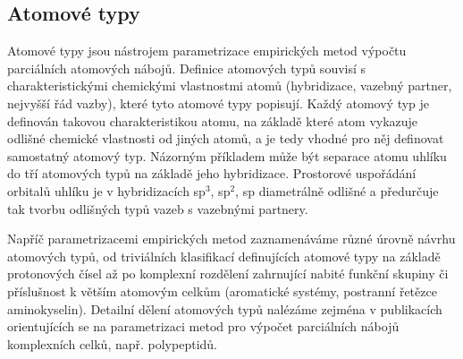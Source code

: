 
\subsection{Atomové typy}
Atomové typy jsou nástrojem parametrizace empirických metod výpočtu parciálních atomových nábojů. Definice atomových typů souvisí s charakteristickými chemickými vlastnostmi atomů (hybridizace, vazebný partner, nejvyšší řád vazby), které tyto atomové typy popisují. Každý atomový typ je definován takovou charakteristikou atomu, na základě které atom vykazuje odlišné chemické vlastnosti od jiných atomů, a je tedy vhodné pro něj definovat samostatný atomový typ. Názorným příkladem může být separace atomu uhlíku do tří atomových typů na základě jeho hybridizace. Prostorové uspořádání orbitalů uhlíku je v hybridizacích sp$^3$, sp$^2$, sp diametrálně odlišné a předurčuje tak tvorbu odlišných typů vazeb s vazebnými partnery. 

Napříč parametrizacemi empirických metod zaznamenáváme různé úrovně návrhu atomových typů, od triviálních klasifikací definujících atomové typy na základě protonových čísel až po komplexní rozdělení zahrnující nabité funkční skupiny či příslušnost k větším atomovým celkům (aromatické systémy, postranní řetězce aminokyselin). Detailní dělení atomových typů nalézáme zejména v publikacích orientujících se na parametrizaci metod pro výpočet parciálních nábojů komplexních celků, např. polypeptidů.

